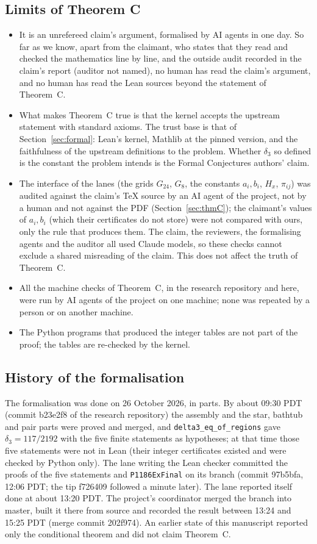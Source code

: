 \documentclass[11pt]{amsart}
\theoremstyle{remark}
\newcommand{\lean}[1]{\texttt{#1}}
\begin{document}
\subsection{Limits of Theorem C}\label{sec:claimlimits}
\begin{itemize}
\item It is an unrefereed claim's argument, formalised by AI agents in one day. So far as we know, apart from the claimant, who states that they read and checked the mathematics line by line, and the outside audit recorded in the claim's report (auditor not named), no human has read the claim's argument, and no human has read the Lean sources beyond the statement of Theorem~C.
\item What makes Theorem~C true is that the kernel accepts the upstream statement with standard axioms. The trust base is that of Section~\ref{sec:formal}: Lean's kernel, Mathlib at the pinned version, and the faithfulness of the upstream definitions to the problem. Whether $\delta_3$ so defined is the constant the problem intends is the Formal Conjectures authors' claim.
\item The interface of the lanes (the grids $G_{24}$, $G_8$, the constants $a_i,b_i$, $H_x$, $\pi_{ij}$) was audited against the claim's TeX source by an AI agent of the project, not by a human and not against the PDF (Section~\ref{sec:thmC}); the claimant's values of $a_i,b_i$ (which their certificates do not store) were not compared with ours, only the rule that produces them. The claim, the reviewers, the formalising agents and the auditor all used Claude models, so these checks cannot exclude a shared misreading of the claim. This does not affect the truth of Theorem~C.
\item All the machine checks of Theorem~C, in the research repository and here, were run by AI agents of the project on one machine; none was repeated by a person or on another machine.
\item The Python programs that produced the integer tables are not part of the proof; the tables are re-checked by the kernel.
\end{itemize}

\subsection{History of the formalisation}
The formalisation was done on 26 October 2026, in parts. By about 09:30 PDT (commit b23e2f8 of the research repository) the assembly and the star, bathtub and pair parts were proved and merged, and \lean{delta3\_eq\_of\_regions} gave $\delta_3=117/2192$ with the five finite statements as hypotheses; at that time those five statements were not in Lean (their integer certificates existed and were checked by Python only). The lane writing the Lean checker committed the proofs of the five statements and \texttt{P1186ExFinal} on its branch (commit 97b5bfa, 12:06 PDT; the tip f726409 followed a minute later). The lane reported itself done at about 13:20 PDT. The project's coordinator merged the branch into master, built it there from source and recorded the result between 13:24 and 15:25 PDT (merge commit 202f974). An earlier state of this manuscript reported only the conditional theorem and did not claim Theorem~C.
\end{document}

